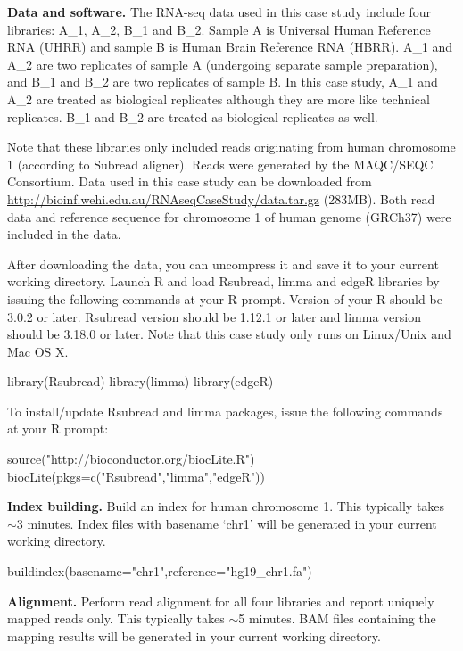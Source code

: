 \documentclass[12pt]{report}
\newcommand{\Subread}{\textsf{Subread}}
\newcommand{\Rsubread}{\textsf{Rsubread}}
\newcommand{\limma}{\textsf{limma}}
\newcommand{\edgeR}{\textsf{edgeR}}
\newcommand{\R}{\textsf{R}}
\begin{document}
{\noindent\bf Data and software.} The RNA-seq data used in this case study include four libraries: A\_1, A\_2, B\_1 and B\_2.
Sample A is Universal Human Reference RNA (UHRR) and sample B is Human Brain Reference RNA (HBRR).
A\_1 and A\_2 are two replicates of sample A (undergoing separate sample preparation), and B\_1 and B\_2 are two replicates of sample B.
In this case study, A\_1 and A\_2 are treated as biological replicates although they are more like technical replicates.
B\_1 and B\_2 are treated as biological replicates as well.

Note that these libraries only included reads originating from human chromosome 1 (according to {\Subread} aligner).
Reads were generated by the MAQC/SEQC Consortium.
Data used in this case study can be downloaded from\\
\url{http://bioinf.wehi.edu.au/RNAseqCaseStudy/data.tar.gz} (283MB).
Both read data and reference sequence for chromosome 1 of human genome (GRCh37) were included in the data.

After downloading the data, you can uncompress it and save it to your current working directory.
Launch {\R} and load {\Rsubread}, {\limma} and {\edgeR} libraries by issuing the following commands at your R prompt.
Version of your {\R} should be 3.0.2 or later.
{\Rsubread} version should be 1.12.1 or later and {\limma} version should be 3.18.0 or later.
Note that this case study only runs on Linux/Unix and Mac OS X.

\begin{Rcode}
library(Rsubread)
library(limma)
library(edgeR)
\end{Rcode}

To install/update {\Rsubread} and {\limma} packages, issue the following commands at your R prompt:
\begin{Rcode}
source("http://bioconductor.org/biocLite.R")
biocLite(pkgs=c("Rsubread","limma","edgeR"))
\end{Rcode}

{\noindent\bf Index building.} Build an index for human chromosome 1. This typically takes $\sim$3 minutes. Index files with basename `chr1' will be generated in your current working directory.

\begin{Rcode}
buildindex(basename="chr1",reference="hg19_chr1.fa")
\end{Rcode}

{\noindent\bf Alignment.} Perform read alignment for all four libraries and report uniquely mapped reads only. This typically takes $\sim$5 minutes. BAM files containing the mapping results will be generated in your current working directory.
\end{document}
